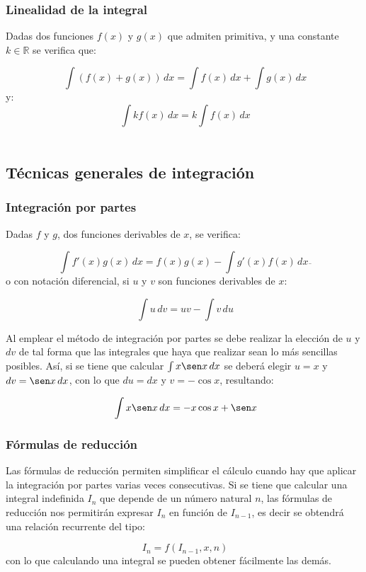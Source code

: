 \subsubsection*{Linealidad de la integral}

Dadas dos funciones $f(x)$ y $g(x)$ que admiten primitiva, y una
constante $k \in \mathbb{R}$ se verifica que:

\[
\ \int{(f(x)+g(x))}\,dx=\int{f(x)}\,dx+\int{g(x)}\,dx
\]
y:
\[
\ \int{kf(x)}\,dx=k\int{f(x)}\,dx
\]\\


\subsection*{Técnicas generales de integración}

\subsubsection*{Integración por partes}

Dadas $f$ y $g$, dos funciones derivables de $x$, se verifica:

\[
\ \int{f'(x)g(x)}\,dx=f(x)g(x)-\int{g'(x)f(x)}\,dx\overline{}
\]
o con notación diferencial, si $u$ y $v$ son funciones derivables de
$x$:

\[
\ \int{u}\,dv=uv-\int{v}\,du
\]


Al emplear el método de integración por partes se debe realizar la
elección de $u$ y $dv$ de tal forma que las integrales que haya que
realizar sean lo más sencillas posibles. Así, si se tiene que
calcular $\int{x \sen x}\,dx$ se deberá elegir $u=x$ y $dv=\sen x\,
dx$, con lo que $du=dx$ y $v=-\cos x$, resultando:

\[
\ \int{x \sen x}\,dx=-x\cos x+\sen x
\]

\subsubsection*{Fórmulas de reducción}

Las fórmulas de reducción permiten simplificar el cálculo cuando hay
que aplicar la integración por partes varias veces consecutivas. Si
se tiene que calcular una integral indefinida $I_{n}$ que depende de
un número natural $n$, las fórmulas de reducción nos permitirán
expresar $I_{n}$ en función de $I_{n-1}$, es decir se obtendrá una
relación recurrente del tipo:

\[
\ I_{n}=f(I_{n-1},x,n)
\]
con lo que calculando una integral se pueden obtener fácilmente las
demás.

